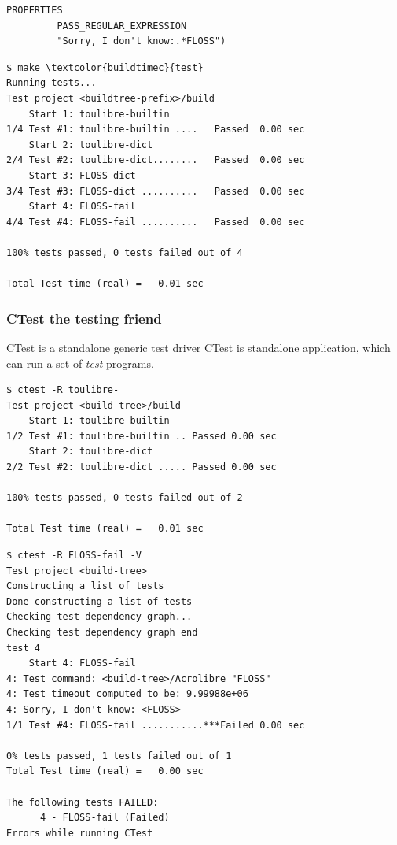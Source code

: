 \documentclass[compress,slidestop,table,usepdftitle=false
              ]
               {beamer}
\begin{document}
\begin{frame}
\begin{multicols}{2}
\begin{lstlisting}[escapechar={§},basicstyle=\tiny,caption=add CTest support]
         PROPERTIES
         PASS_REGULAR_EXPRESSION
         "Sorry, I don't know:.*FLOSS")
\end{lstlisting}
\columnbreak
\begin{Verbatim}[commandchars=\\\{\},fontsize=\tiny]
$ make \textcolor{buildtimec}{test}
Running tests...
Test project <buildtree-prefix>/build
    Start 1: toulibre-builtin
1/4 Test #1: toulibre-builtin ....   Passed  0.00 sec
    Start 2: toulibre-dict
2/4 Test #2: toulibre-dict........   Passed  0.00 sec
    Start 3: FLOSS-dict
3/4 Test #3: FLOSS-dict ..........   Passed  0.00 sec
    Start 4: FLOSS-fail
4/4 Test #4: FLOSS-fail ..........   Passed  0.00 sec

100% tests passed, 0 tests failed out of 4

Total Test time (real) =   0.01 sec
\end{Verbatim}
\end{multicols}
\end{frame}

\begin{frame}[fragile]
\frametitle{CTest the testing friend}
\begin{block}{CTest is a standalone generic test driver}
CTest is standalone application, which can run a set of \emph{test} programs.
\end{block}
\vspace*{-0.5cm}
\begin{multicols}{2}
\begin{Verbatim}[commandchars=\\\{\},fontsize=\tiny]
$ ctest -R toulibre-
Test project <build-tree>/build
    Start 1: toulibre-builtin
1/2 Test #1: toulibre-builtin .. Passed 0.00 sec
    Start 2: toulibre-dict
2/2 Test #2: toulibre-dict ..... Passed 0.00 sec

100% tests passed, 0 tests failed out of 2

Total Test time (real) =   0.01 sec
\end{Verbatim}
\columnbreak
\begin{Verbatim}[commandchars=\\\{\},fontsize=\tiny]
$ ctest -R FLOSS-fail -V
Test project <build-tree>
Constructing a list of tests
Done constructing a list of tests
Checking test dependency graph...
Checking test dependency graph end
test 4
    Start 4: FLOSS-fail
4: Test command: <build-tree>/Acrolibre "FLOSS"
4: Test timeout computed to be: 9.99988e+06
4: Sorry, I don't know: <FLOSS>
1/1 Test #4: FLOSS-fail ...........***Failed 0.00 sec

0% tests passed, 1 tests failed out of 1
Total Test time (real) =   0.00 sec

The following tests FAILED:
	  4 - FLOSS-fail (Failed)
Errors while running CTest
\end{Verbatim}
\end{multicols}
\end{frame}
\end{document}
